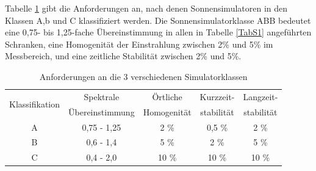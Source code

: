 \documentclass[a4paper,bibtotoc,oneside]{scrbook}
\begin{document}
Tabelle \ref{TabS2} gibt die Anforderungen an, nach denen Sonnensimulatoren in den Klassen A,b und C klassifiziert werden. Die Sonnensimulatorklasse ABB bedeutet eine 0,75- bis 1,25-fache Übereinstimmung in allen in Tabelle \ref{TabS1} angeführten Schranken, eine Homogenität der Einstrahlung zwischen 2\% und 5\% im Messbereich, und eine zeitliche Stabilität zwischen 2\% und 5\%. 
\begin{table}[htbp]
\centering
\begin{tabular}{ | c | c | c | c | c |}\hline
\multirow{2}{*}{Klassifikation} &  Spektrale  &  Örtliche  & {Kurzzeit-}& {Langzeit-}\\
& Übereinstimmung & Homogenität & {stabilität} & {stabilität} \\ 
\hline
\hline
A  & 0,75 - 1,25 & 2 \% & 0,5 \% & 2 \%\\ \hline
B  & 0,6 - 1,4 & 5 \% & 2 \% & 5 \%\\ \hline
C  & 0,4 - 2,0 & 10 \% & 10 \% & 10 \%\\ \hline

\end{tabular}
\caption{Anforderungen an die 3 verschiedenen Simulatorklassen}\label{TabS2}
\end{table}
\end{document}
